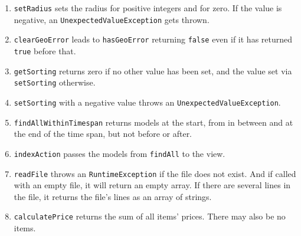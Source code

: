 \documentclass[a4paper,12pt]{scrartcl}
\begin{document}
\begin{enumerate}
  \item \texttt{setRadius} sets the radius for positive integers and for zero. If the value is negative, an \texttt{UnexpectedValueException} gets thrown.

  \item \texttt{clearGeoError} leads to \texttt{hasGeoError} returning \texttt{false} even if it has returned \texttt{true} before that.

  \item \texttt{getSorting} returns zero if no other value has been set, and the value set via \texttt{setSorting} otherwise.

  \item \texttt{setSorting} with a negative value throws an \texttt{UnexpectedValueException}.

  \item \texttt{findAllWithinTimespan} returns models at the start, from in between and at the end of the time span, but not before or after.

  \item \texttt{indexAction} passes the models from \texttt{findAll} to the view.
  
  \item \texttt{readFile} throws an \texttt{RuntimeException} if the file does not exist. And if called with an empty file, it will return an empty array. If there are several lines in the file, it returns the file's lines as an array of strings.
  
  \item \texttt{calculatePrice} returns the sum of all items' prices. There may also be no items.
\end{enumerate}
\end{document}
